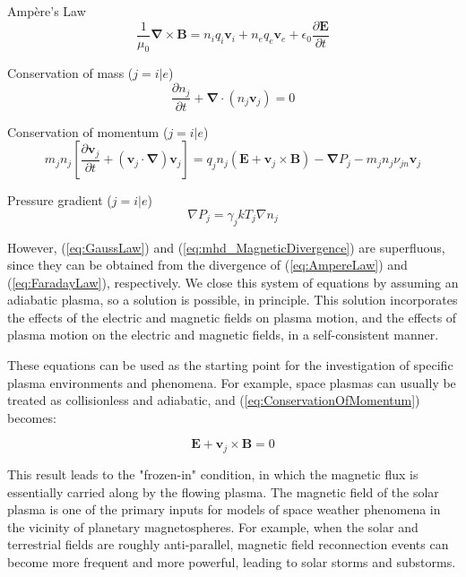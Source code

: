 \documentclass{article}
\begin{document}
Amp\`{e}re's Law
\begin{equation}
    \frac {1} {\mu_0} \mathbf \nabla \times \mathbf B = n_i q_i \mathbf v_i + n_e q_e \mathbf v_e + \epsilon_0 \frac {\partial \mathbf E} {\partial t}
    \label{eq:AmpereLaw}
\end{equation}

Conservation of mass ($j = i|e$)
\begin{equation}
    \frac {\partial n_j} {\partial t} + \mathbf \nabla \cdotp \left(n_j \mathbf v_j \right) = 0
    \label{eq:ConservationOfMass}
\end{equation}

Conservation of momentum ($j = i|e$)
\begin{equation}
  m_j n_j \left[ \frac {\partial \mathbf v_j} {\partial t} + \left( \mathbf v_j \cdotp \mathbf \nabla \right) \mathbf v_j \right] = q_j n_j \left(\mathbf E + \mathbf v_j \times \mathbf B \right) - \mathbf \nabla P_j - m_j n_j \nu_{jn} \mathbf v_j
  \label{eq:ConservationOfMomentum}
\end{equation}

Pressure gradient ($j = i|e$)
\begin{equation}
    \nabla P_j = \gamma_j k T_j \nabla n_j
    \label{eq:PressureGradient}
\end{equation}

\noindent However, (\ref{eq:GaussLaw}) and (\ref{eq:mhd_MagneticDivergence}) are superfluous, since they can be obtained from the divergence of (\ref{eq:AmpereLaw}) and (\ref{eq:FaradayLaw}), respectively. We close this system of equations by assuming an adiabatic plasma, so a solution is possible, in principle. This solution incorporates the effects of the electric and magnetic fields on plasma motion, and the effects of plasma motion on the electric and magnetic fields, in a self-consistent manner.

These equations can be used as the starting point for the investigation of specific plasma environments and phenomena. For example, space plasmas can usually be treated as collisionless and adiabatic, and (\ref{eq:ConservationOfMomentum}) becomes:

\begin{equation}
    \mathbf E + \mathbf v_j \times \mathbf B = 0
    \label{eq:IdealMHDOhmLaw}
\end{equation}

\noindent This result leads to the "frozen-in" condition, in which the magnetic flux is essentially carried along by the flowing plasma. The magnetic field of the solar plasma is one of the primary inputs for models of space weather phenomena in the vicinity of planetary magnetospheres. For example, when the solar and terrestrial fields are roughly anti-parallel, magnetic field reconnection events can become more frequent and more powerful, leading to solar storms and substorms.
\end{document}
